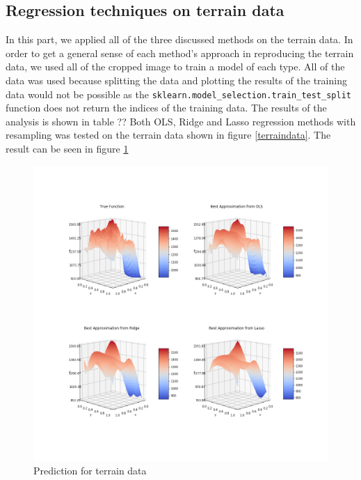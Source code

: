 \documentclass{article}
\begin{document}
\subsection{Regression techniques on terrain data}
In this part, we applied all of the three discussed methods on the terrain data. In order to get a general sense of each method's approach in reproducing the terrain data, we used all of the cropped image to train a model of each type. All of the data was used because splitting the data and plotting the results of the training data would not be possible as the \verb+sklearn.model_selection.train_test_split+ function does not return the indices of the training data. The results of the analysis is shown in table ??
Both OLS, Ridge and Lasso regression methods with resampling was tested on the terrain data shown in figure \ref{terraindata}. The result can be seen in figure \ref{fig:realDataPlot}
\begin{figure}[h]\centering
\includegraphics[scale=0.4]{Plots/PlotsRealData.png}
\caption{Prediction for terrain data}
\label{fig:realDataPlot}
\end{figure}

\clearpage
\end{document}
